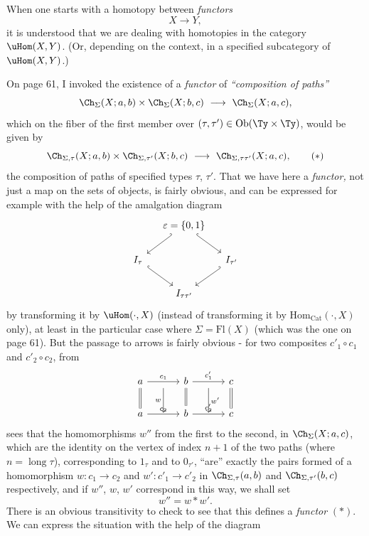 When one starts with a homotopy between \textit{functors}
\[
X \longrightarrow Y,
\]
it is understood that we are dealing with homotopies in the category $\uHom(X,Y)$. (Or, depending on the context, in a specified subcategory of $\uHom(X,Y)$.)

On page 61, I invoked the existence of a \textit{functor} of \textit{``composition of paths''}
\[
\Ch_{\Sigma}(X;a,b)\times\Ch_{\Sigma}(X;b,c) \ \longrightarrow\ \Ch_{\Sigma}(X;a,c),
\]
which on the fiber of the first member over $(\tau,\tau') \in \operatorname{Ob}(\Ty\times\Ty)$, would be given by
\[
\Ch_{\Sigma,\tau}(X;a,b)\times\Ch_{\Sigma,\tau'}(X;b,c) \ \longrightarrow\ \Ch_{\Sigma,\tau\tau'}(X;a,c), \tag*{$(*)$}
\]
the composition of paths of specified types $\tau$, $\tau'$. That we have here a \textit{functor,} not just a map on the sets of objects, is fairly obvious, and can be expressed for example with the help of the amalgation diagram
\[
\begin{tikzcd}[column sep=small]
 & \varepsilon = \{0,1\} \ar[dl,hook'] \ar[dr,hook] & \\
I_{\tau} \ar[dr,hook] & & I_{\tau'} \ar[dl,hook'] \\
 & I_{\tau\tau'} &
\end{tikzcd}
\]
by transforming it by $\uHom(\cdot,X)$ (instead of transforming it by $\mathrm{Hom}_{\mathrm{Cat}}(\cdot,X)$ only), at least in the particular case where $\Sigma = \mathrm{Fl}(X)$ (which was the one on page 61). But the passage to arrows is fairly obvious - for two composites $c'_1\circ c_1$ and $c'_2\circ c_2$, from
\[
\begin{tikzcd}[column sep=small]
a \ar[rr,"c_1"] \ar[d,equal] & {} \ar[d,"w"'] & b \ar[rr,"c'_1"] \ar[d,equal] & {} \ar[d,"w'"] & c \ar[d,equal] \\
a \ar[rr,"c_2"] & {} & b \ar[rr,"c'_2"] & {} & c
\end{tikzcd}
\]
 sees that the homomorphisms $w''$ from the first to the second, in $\Ch_{\Sigma}(X;a,c)$, which are the identity on the vertex of index $n+1$ of the two paths (where $n = \operatorname{long}\tau$), corresponding to $1_{\tau}$ and to $0_{\tau'}$, ``are'' exactly the pairs
formed of a homomorphism $w : c_1 \longrightarrow c_2$ and $w' : c'_1 \longrightarrow c'_2$ in $\Ch_{\Sigma,\tau}(a,b)$ and $\Ch_{\Sigma,\tau'}(b,c)$ respectively, and if $w''$, $w$, $w'$ correspond in this way, we shall set
\[
w'' = w * w'.
\]
There is an obvious transitivity to check to see that this defines a \textit{functor} $(*)$. We can express the situation with the help of the diagram
